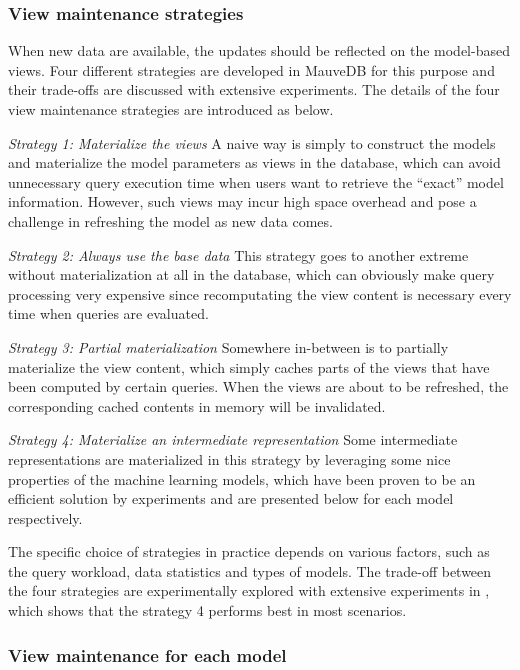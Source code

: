 \subsubsection{View maintenance strategies}
When new data are available, the updates should be reflected on the model-based views. Four different strategies are developed in MauveDB for this purpose and their trade-offs are discussed with extensive experiments. The details of the four view maintenance strategies are introduced as below.

\textit{Strategy 1: Materialize the views}
A naive way is simply to construct the models and materialize the model parameters as views in the database, which can avoid unnecessary query execution time when users want to retrieve the ``exact'' model information. However, such views may incur high space overhead and pose a challenge in refreshing the model as new data comes.

\textit{Strategy 2: Always use the base data }
This strategy goes to another extreme without materialization at all in the database, which can obviously make query processing very expensive since recomputating the view content is necessary every time when queries are evaluated. 

\textit{Strategy 3: Partial materialization}
Somewhere in-between is to partially materialize the view content, which simply caches parts of the views that have been computed by certain queries. When the views are about to be refreshed, the corresponding cached contents in memory will be invalidated.

\textit{Strategy 4: Materialize an intermediate representation}
Some intermediate representations are materialized in this strategy by leveraging some nice properties of the machine learning models, which have been proven to be an efficient solution by experiments and are presented below for each model respectively.

The specific choice of strategies in practice depends on various factors, such as the query workload, data statistics and types of models. The trade-off between the four strategies are experimentally explored with extensive experiments in \cite{deshpande2006mauvedb}, which shows that the strategy 4 performs best in most scenarios.

\subsubsection{View maintenance for each model}\label{sec: view_maintenance_model}

